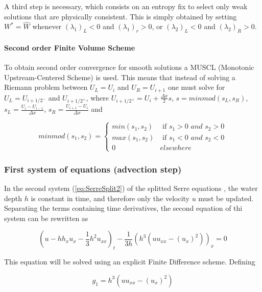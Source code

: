 A third step is necessary, which consists on an entropy fix to select only weak solutions that are physically consistent. This is simply obtained by setting $W^* = \hat W$ whenever $(\lambda_1)_L < 0$ and $(\lambda_1)_r >0$, or $(\lambda_2)_L < 0 $ and $(\lambda_2)_R>0$.

\paragraph{Second order Finite Volume Scheme}

To obtain second order convergence for smooth solutions a MUSCL (Monotonic Upstream-Centered Scheme) is used. This means that instead of solving a Riemann problem between $U_L=U_{i}$ and $U_R=U_{i+1}$ one must solve for $U_L = U_{i+1/2^-}$ and $U_{i+1/2^+}$, where $U_{i+1/2^+} = U_i + \frac{\Delta x}{2} s$,  $s = minmod(s_L,s_R)$, 
$s_L = \frac{U_{i}-U_{i-1}}{\Delta x}$, 
$s_R = \frac{U_{i+1}-U_{i}}{\Delta x}$ and

\begin{equation}
	minmod(s_1,s_2) = \begin{cases}
		min(s_1,s_2) & \text{ if } s_1>0 \textit{ and } s_2>0 \\
		max(s_1,s_2) & \text{ if } s_1<0 \textit{ and } s_2<0 \\
		0 & elsewhere
	\end{cases}
\end{equation}

\subsubsection{First system of equations (advection step)}

\indent In the second system (\ref{eq:SerreSplit2}) of the splitted Serre equations , the water depth $h$ is constant in time, and therefore only the velocity $u$ must be updated. Separating the terms containing time derivatives, the second equation of thi system can be rewritten as

\begin{equation}
\label{eq:dispersive}
\left( u - hh_xu_x - \frac{1}{3}h^2u_{xx} \right)_t  - \frac{1}{3h}\left(h^3 \left( uu_{xx} - (u_x)^2  \right) \right)_x = 0
\end{equation}

\indent This equation will be solved using an explicit Finite Difference scheme. Defining

$$g_1 = h^3 \left( uu_{xx} - (u_x)^2 \right)$$


